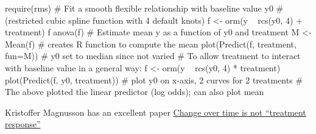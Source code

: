 \begin{Schunk}
\begin{Sinput}
require(rms)
# Fit a smooth flexible relationship with baseline value y0
# (restricted cubic spline function with 4 default knots)
f <- orm(y ~ rcs(y0, 4) + treatment)
f
anova(f)
# Estimate mean y as a function of y0 and treatment
M <- Mean(f)   # creates R function to compute the mean
plot(Predict(f, treatment, fun=M))  # y0 set to median since not varied
# To allow treatment to interact with baseline value in a general way:
f <- orm(y ~ rcs(y0, 4) * treatment)
plot(Predict(f, y0, treatment))  # plot y0 on x-axis, 2 curves for 2 treatments
# The above plotted the linear predictor (log odds); can also plot mean
\end{Sinput}
\end{Schunk}

Kristoffer Magnusson has an excellent paper
\href{http://rpsychologist.com/treatment-response-subgroup}{Change
  over time is not ``treatment response''}

